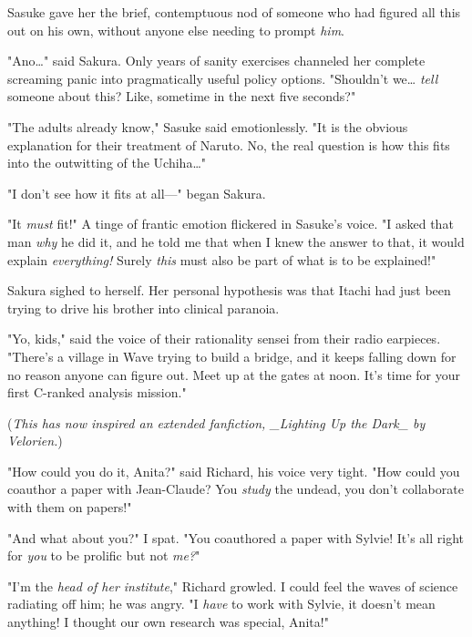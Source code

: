 Sasuke gave her the brief, contemptuous nod of someone who had figured all this 
out on his own, without anyone else needing to prompt \emph{him}.

"Ano{\ldots}" said Sakura. Only years of sanity exercises channeled her 
complete screaming panic into pragmatically useful policy options. "Shouldn't 
we{\ldots} \emph{tell} someone about this? Like, sometime in the next five 
seconds?"

"The adults already know," Sasuke said emotionlessly. "It is the obvious 
explanation for their treatment of Naruto. No, the real question is how this 
fits into the outwitting of the Uchiha{\ldots}"

"I don't see how it fits at all---" began Sakura.

"It \emph{must} fit!" A tinge of frantic emotion flickered in Sasuke's voice. 
"I asked that man \emph{why} he did it, and he told me that when I knew the 
answer to that, it would explain \emph{everything!} Surely \emph{this} must 
also be part of what is to be explained!"

Sakura sighed to herself. Her personal hypothesis was that Itachi had just been 
trying to drive his brother into clinical paranoia.

"Yo, kids," said the voice of their rationality sensei from their radio 
earpieces. "There's a village in Wave trying to build a bridge, and it keeps 
falling down for no reason anyone can figure out. Meet up at the gates at noon. 
It's time for your first C-ranked analysis mission."

(\emph{This has now inspired an extended fanfiction, \_Lighting Up the Dark\_ by 
Velorien.})
\sbreak


\noindent{}"How could you do it, Anita?" said Richard, his voice very tight. "How could 
you coauthor a paper with Jean-Claude? You \emph{study} the undead, you don't 
collaborate with them on papers!"

"And what about you?" I spat. "You coauthored a paper with Sylvie! It's all 
right for \emph{you} to be prolific but not \emph{me?}"

"I'm the \emph{head of her institute}," Richard growled. I could feel the waves 
of science radiating off him; he was angry. "I \emph{have} to work with Sylvie, 
it doesn't mean anything! I thought our own research was special, Anita!"

